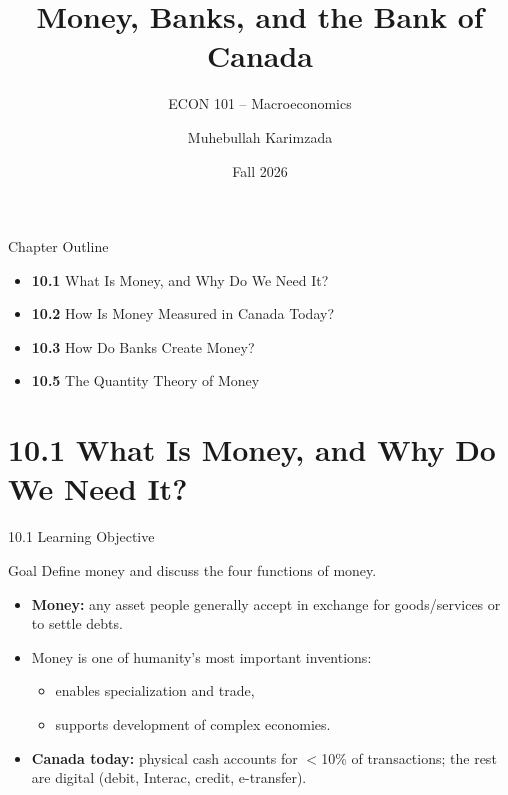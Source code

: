 \documentclass[aspectratio=169]{beamer}
\title{\textbf{Money, Banks, and the Bank of Canada}}
\subtitle{{\large ECON 101 -- Macroeconomics}}
\author{Muhebullah Karimzada}
\date{Fall 2026}
\begin{document}

\begin{frame}[plain]
  \titlepage
\end{frame}

\begin{frame}{Chapter Outline}
\transfade
\begin{itemize}
  \item \textbf{10.1} What Is Money, and Why Do We Need It?
  \item \textbf{10.2} How Is Money Measured in Canada Today?
  \item \textbf{10.3} How Do Banks Create Money?
  \item \textbf{10.5} The Quantity Theory of Money
\end{itemize}
\end{frame}

\section{10.1 What Is Money, and Why Do We Need It?}

\begin{frame}{10.1 Learning Objective}
\transfade
\begin{block}{Goal}
Define money and discuss the four functions of money.
\end{block}
\begin{itemize}
  \item \textbf{Money:} any asset people generally accept in exchange for goods/services or to settle debts.
  \item Money is one of humanity's most important inventions:
  \begin{itemize}
    \item enables specialization and trade,
    \item supports development of complex economies.
  \end{itemize}
  \item \textbf{Canada today:} physical cash accounts for $<$10\% of transactions; the rest are digital (debit, Interac, credit, e-transfer).
\end{itemize}
\end{frame}
\end{document}
